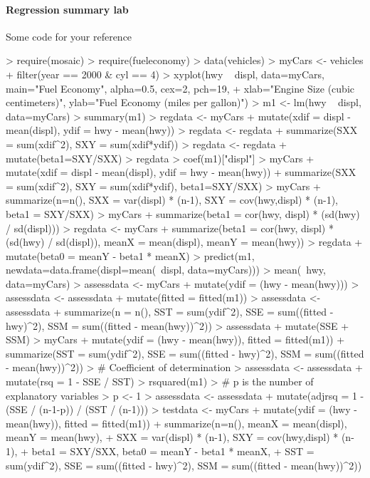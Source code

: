 \documentclass[10pt]{article}
\begin{document}
\paragraph{Regression summary lab}
Some code for your reference
\begin{Schunk}
\begin{Sinput}
> require(mosaic)
> require(fueleconomy)
> data(vehicles)
> myCars <- vehicles %>%
+   filter(year == 2000 & cyl == 4)
> xyplot(hwy ~ displ, data=myCars, main="Fuel Economy", alpha=0.5, cex=2, pch=19, 
+        xlab="Engine Size (cubic centimeters)", ylab="Fuel Economy (miles per gallon)")
> m1 <- lm(hwy ~ displ, data=myCars)
> summary(m1)
> regdata <- myCars %>% 
+   mutate(xdif = displ - mean(displ),  ydif = hwy - mean(hwy))
> regdata <- regdata %>% 
+   summarize(SXX = sum(xdif^2),  SXY = sum(xdif*ydif))
> regdata <- regdata %>% 
+   mutate(beta1=SXY/SXX)
> regdata
> coef(m1)["displ"]
> myCars %>% 
+   mutate(xdif = displ - mean(displ),  ydif = hwy - mean(hwy)) %>% 
+   summarize(SXX = sum(xdif^2), SXY = sum(xdif*ydif), beta1=SXY/SXX) 
> myCars %>% 
+   summarize(n=n(), SXX = var(displ) * (n-1), SXY = cov(hwy,displ) * (n-1), beta1 = SXY/SXX)
> myCars %>% 
+   summarize(beta1 = cor(hwy, displ) * (sd(hwy) / sd(displ)))
> regdata <- myCars %>% 
+   summarize(beta1 = cor(hwy, displ) * (sd(hwy) / sd(displ)), meanX = mean(displ), meanY = mean(hwy))
> regdata %>% 
+   mutate(beta0 = meanY - beta1 * meanX)
> predict(m1, newdata=data.frame(displ=mean(~displ, data=myCars)))
> mean(~hwy, data=myCars)
> assessdata <- myCars %>% 
+   mutate(ydif = (hwy - mean(hwy)))
> assessdata <- assessdata %>% 
+   mutate(fitted = fitted(m1))
> assessdata <- assessdata %>%
+   summarize(n = n(), SST = sum(ydif^2), SSE = sum((fitted - hwy)^2), SSM = sum((fitted - mean(hwy))^2))
> assessdata %>% 
+   mutate(SSE + SSM)
> myCars %>% 
+   mutate(ydif = (hwy - mean(hwy)), fitted = fitted(m1))  %>%
+   summarize(SST = sum(ydif^2), SSE = sum((fitted - hwy)^2), SSM = sum((fitted - mean(hwy))^2))
> # Coefficient of determination
> assessdata <- assessdata %>% 
+   mutate(rsq = 1 - SSE / SST)
> rsquared(m1)
> # p is the number of explanatory variables
> p <- 1
> assessdata <- assessdata %>%
+   mutate(adjrsq = 1 - (SSE / (n-1-p)) / (SST / (n-1)))
> testdata <- myCars %>% 
+    mutate(ydif = (hwy - mean(hwy)), fitted = fitted(m1)) %>%
+   summarize(n=n(), meanX = mean(displ), meanY = mean(hwy),
+             SXX = var(displ) * (n-1), SXY = cov(hwy,displ) * (n-1),
+             beta1 = SXY/SXX, beta0 = meanY - beta1 * meanX,
+             SST = sum(ydif^2), SSE = sum((fitted - hwy)^2), SSM = sum((fitted - mean(hwy))^2))

\end{Sinput}
\end{Schunk}
\end{document}
